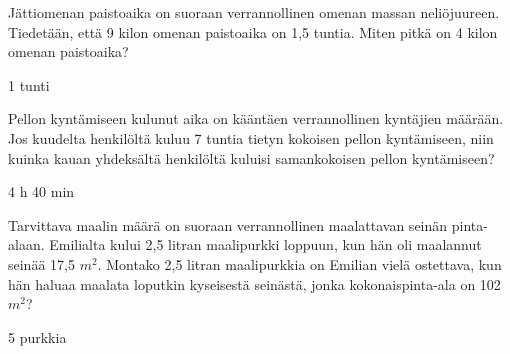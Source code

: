 \begin{tehtava}
	Jättiomenan paistoaika on suoraan verrannollinen omenan massan neliöjuureen. Tiedetään, että 9 kilon omenan paistoaika on 1,5 tuntia. Miten pitkä on 4 kilon omenan paistoaika?
    \begin{vastaus}
        1 tunti
    \end{vastaus}
\end{tehtava}

\begin{tehtava}
	Pellon kyntämiseen kulunut aika on kääntäen verrannollinen kyntäjien määrään. Jos kuudelta henkilöltä kuluu 7 tuntia tietyn kokoisen pellon kyntämiseen, niin kuinka kauan yhdeksältä henkilöltä kuluisi samankokoisen pellon kyntämiseen?
    \begin{vastaus}
        4 h 40 min
    \end{vastaus}
\end{tehtava}

\begin{tehtava}
	Tarvittava maalin määrä on suoraan verrannollinen maalattavan seinän pinta-alaan. Emilialta kului 2,5 litran maalipurkki  loppuun, kun hän oli maalannut seinää 17,5 $m^2$. Montako 2,5 litran maalipurkkia on Emilian vielä ostettava, kun hän haluaa maalata loputkin kyseisestä seinästä, jonka kokonaispinta-ala on 102 $m^2$?
    \begin{vastaus}
        5 purkkia
    \end{vastaus}
\end{tehtava}

